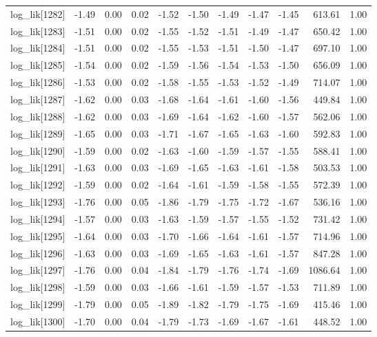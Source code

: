 \begin{table}[ht]
\begin{tabular}{rrrrrrrrrrr}
  log\_lik[1282] & -1.49 & 0.00 & 0.02 & -1.52 & -1.50 & -1.49 & -1.47 & -1.45 & 613.61 & 1.00 \\ 
  log\_lik[1283] & -1.51 & 0.00 & 0.02 & -1.55 & -1.52 & -1.51 & -1.49 & -1.47 & 650.42 & 1.00 \\ 
  log\_lik[1284] & -1.51 & 0.00 & 0.02 & -1.55 & -1.53 & -1.51 & -1.50 & -1.47 & 697.10 & 1.00 \\ 
  log\_lik[1285] & -1.54 & 0.00 & 0.02 & -1.59 & -1.56 & -1.54 & -1.53 & -1.50 & 656.09 & 1.00 \\ 
  log\_lik[1286] & -1.53 & 0.00 & 0.02 & -1.58 & -1.55 & -1.53 & -1.52 & -1.49 & 714.07 & 1.00 \\ 
  log\_lik[1287] & -1.62 & 0.00 & 0.03 & -1.68 & -1.64 & -1.61 & -1.60 & -1.56 & 449.84 & 1.00 \\ 
  log\_lik[1288] & -1.62 & 0.00 & 0.03 & -1.69 & -1.64 & -1.62 & -1.60 & -1.57 & 562.06 & 1.00 \\ 
  log\_lik[1289] & -1.65 & 0.00 & 0.03 & -1.71 & -1.67 & -1.65 & -1.63 & -1.60 & 592.83 & 1.00 \\ 
  log\_lik[1290] & -1.59 & 0.00 & 0.02 & -1.63 & -1.60 & -1.59 & -1.57 & -1.55 & 588.41 & 1.00 \\ 
  log\_lik[1291] & -1.63 & 0.00 & 0.03 & -1.69 & -1.65 & -1.63 & -1.61 & -1.58 & 503.53 & 1.00 \\ 
  log\_lik[1292] & -1.59 & 0.00 & 0.02 & -1.64 & -1.61 & -1.59 & -1.58 & -1.55 & 572.39 & 1.00 \\ 
  log\_lik[1293] & -1.76 & 0.00 & 0.05 & -1.86 & -1.79 & -1.75 & -1.72 & -1.67 & 536.16 & 1.00 \\ 
  log\_lik[1294] & -1.57 & 0.00 & 0.03 & -1.63 & -1.59 & -1.57 & -1.55 & -1.52 & 731.42 & 1.00 \\ 
  log\_lik[1295] & -1.64 & 0.00 & 0.03 & -1.70 & -1.66 & -1.64 & -1.61 & -1.57 & 714.96 & 1.00 \\ 
  log\_lik[1296] & -1.63 & 0.00 & 0.03 & -1.69 & -1.65 & -1.63 & -1.61 & -1.57 & 847.28 & 1.00 \\ 
  log\_lik[1297] & -1.76 & 0.00 & 0.04 & -1.84 & -1.79 & -1.76 & -1.74 & -1.69 & 1086.64 & 1.00 \\ 
  log\_lik[1298] & -1.59 & 0.00 & 0.03 & -1.66 & -1.61 & -1.59 & -1.57 & -1.53 & 711.89 & 1.00 \\ 
  log\_lik[1299] & -1.79 & 0.00 & 0.05 & -1.89 & -1.82 & -1.79 & -1.75 & -1.69 & 415.46 & 1.00 \\ 
  log\_lik[1300] & -1.70 & 0.00 & 0.04 & -1.79 & -1.73 & -1.69 & -1.67 & -1.61 & 448.52 & 1.00 \\ 

\end{tabular}
\end{table}
